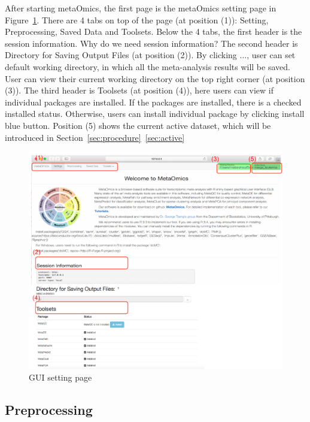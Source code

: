 
After starting metaOmics, 
the first page is the metaOmics setting page in Figure~\ref{fig:GUIsetting}.  
There are 4 tabs on top of the page (at position {\color{red} (1)}): Setting, Preprocessing, Saved Data and Toolsets.
Below the 4 tabs, 
the first header is the session information.
{
\color{blue}
Why do we need session information?
}
The second header is Directory for Saving Output Files (at position {\color{red} (2)}).
By clicking $\ldots$,
user can set default working directory, in which all the meta-analysis results will be saved.
User can view their current working directory on the top right corner (at position {\color{red} (3)}).
The third header is Toolsets (at position {\color{red} (4)}),
here users can view if individual packages are installed.
If the packages are installed, there is a checked installed status.
Otherwise, users can install individual package by clicking install blue button.
Position {\color{red} (5)} shows the current active dataset, which will be introduced in Section~\ref{sec:procedure}~\ref{sec:active}
 
\begin{figure}[H]
\begin{center}
\includegraphics[scale=0.35]{./figure/preprocessing/GUIsetting}
\caption{GUI setting page}
\label{fig:GUIsetting}
\end{center}
\end{figure}

\subsection{Preprocessing}


